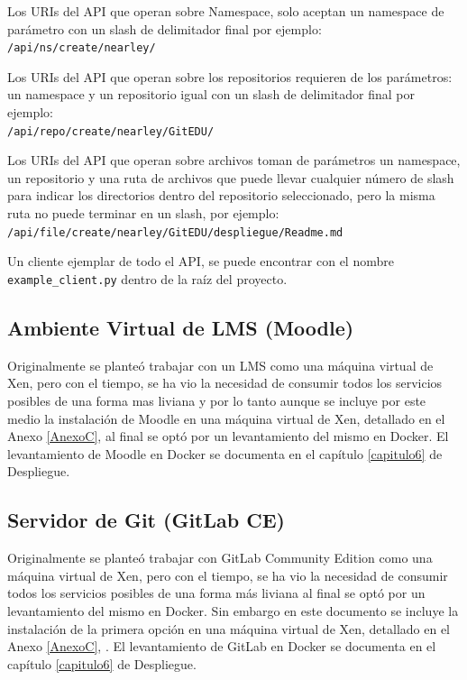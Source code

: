 Los URIs del API que operan sobre Namespace, solo aceptan un namespace de parámetro con un slash de delimitador final por ejemplo: \\
\texttt{/api/ns/create/nearley/}

Los URIs del API que operan sobre los repositorios requieren de los parámetros: un namespace y un repositorio igual con un slash de delimitador final por ejemplo: \\
\texttt{/api/repo/create/nearley/GitEDU/}

Los URIs del API que operan sobre archivos toman de parámetros un namespace, un repositorio y una ruta de archivos que puede llevar cualquier número de slash para indicar los directorios dentro del repositorio seleccionado, pero la misma ruta no puede terminar en un slash, por ejemplo: \\
\texttt{/api/file/create/nearley/GitEDU/despliegue/Readme.md}

Un cliente ejemplar de todo el API, se puede encontrar con el nombre \\
\texttt{example\_client.py} dentro de la raíz del proyecto.

 
\subsection{Ambiente Virtual de LMS  (Moodle)}
\label{instalacion-moodle}
Originalmente se planteó trabajar con un LMS como una máquina virtual de Xen, pero con el tiempo, se ha vio la necesidad de consumir todos los servicios posibles de una forma mas liviana y por lo tanto aunque se incluye por este medio la instalación de Moodle en una máquina virtual de Xen, detallado en el Anexo \ref{AnexoC}, al final se optó por un levantamiento del mismo en Docker. El levantamiento de Moodle en Docker se documenta en el capítulo \ref{capitulo6} de Despliegue.

 
\subsection{Servidor de Git (GitLab CE)}
Originalmente se planteó trabajar con GitLab Community Edition como una máquina virtual de Xen, pero con el tiempo, se ha vio la necesidad de consumir todos los servicios posibles de una forma más liviana al final se optó por un levantamiento del mismo en Docker. Sin embargo en este documento se incluye la instalación de la primera opción en una máquina virtual de Xen, detallado en el Anexo \ref{AnexoC}, . El levantamiento de GitLab en Docker se documenta en el capítulo \ref{capitulo6} de Despliegue.

